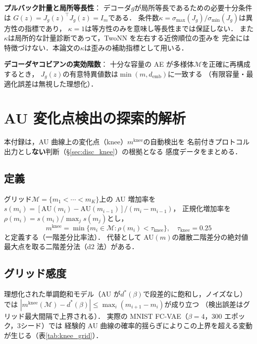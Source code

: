 \documentclass[11pt,a4paper]{jsarticle}
\newcommand{\Jg}{J_g}
\newcommand{\kap}{\kappa}
\newcommand{\demb}{d_{\mathrm{emb}}}
\newcommand{\mknee}{m^{\mathrm{knee}}}
\newcommand{\dstar}{d^{*}(\beta)}
\begin{document}
\textbf{プルバック計量と局所等長性}：
デコーダ$g$が局所等長であるための必要十分条件は
$G(z) = \Jg(z)^\top \Jg(z) = I_m$である．
条件数$\kap = \sigma_{\max}(\Jg)/\sigma_{\min}(\Jg)$は異方性の指標であり，
$\kap = 1$は等方性のみを意味し等長性までは保証しない．
また$\kap$は局所的な計量診断であって，TwoNN を左右する近傍順位の歪みを
完全には特徴づけない．本論文の$\kap$は歪みの補助指標として用いる．

\textbf{デコーダヤコビアンの実効階数}：
十分な容量の AE が多様体$\mathcal{M}$を正確に再構成するとき，
$\Jg(z)$の有意特異値数は$\min(m, \demb)$に一致する
（有限容量・最適化誤差は無視した理想化）．

\section{AU 変化点検出の探索的解析}\label{app:knee}

本付録は，AU 曲線上の変化点（knee）$\mknee$の自動検出を
名前付きプロトコル出力とし\textbf{ない}判断（§\ref{sec:disc_knee}）の根拠となる
感度データをまとめる．

\subsection{定義}

グリッド$\mathcal{M} = \{m_1 < \cdots < m_K\}$上の AU 増加率を
$s(m_i) = [\mathrm{AU}(m_i) - \mathrm{AU}(m_{i-1})] / (m_i - m_{i-1})$，
正規化増加率を$\rho(m_i) = s(m_i) / \max_j s(m_j)$とし，
\begin{equation}
  \mknee = \min\{m_i \in \mathcal{M} : \rho(m_i) < \tau_{\mathrm{knee}}\},
  \quad \tau_{\mathrm{knee}} = 0.25
  \label{eq:mknee}
\end{equation}
と定義する（一階差分比率法）．
代替として AU$(m)$の離散二階差分の絶対値最大点を取る二階差分法（d2 法）がある．

\subsection{グリッド感度}

理想化された単調飽和モデル（AU が$\dstar$で段差的に飽和し，ノイズなし）では
$|\mknee(\mathcal{M}) - \dstar| \leq \max_i (m_{i+1} - m_i)$が成り立つ
（検出誤差はグリッド最大間隔で上界される）．
実際の MNIST FC-VAE（$\beta = 4$，300 エポック，3シード）では
経験的 AU 曲線の確率的揺らぎによりこの上界を超える変動が生じる（表\ref{tab:knee_grid}）．
\end{document}
